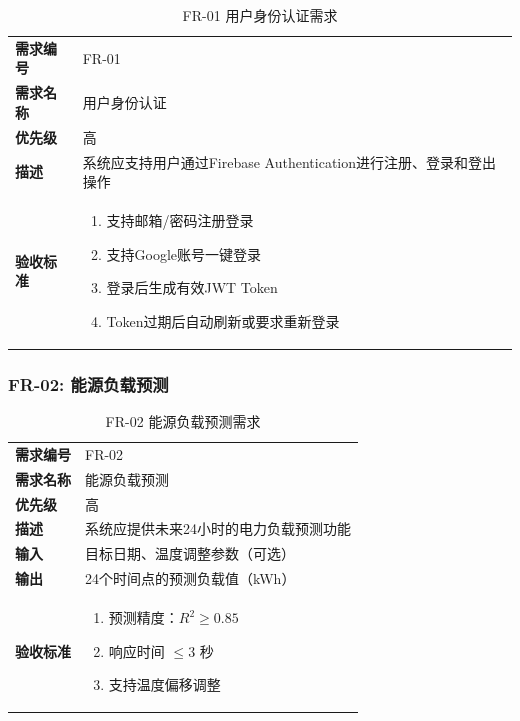 \begin{table}[H]
  \centering
  \caption{FR-01 用户身份认证需求}
  \begin{tabular}{p{3cm}p{10cm}}
    \toprule
    \textbf{需求编号} & FR-01                                        \\
    \textbf{需求名称} & 用户身份认证                                       \\
    \textbf{优先级}  & 高                                            \\
    \textbf{描述}   & 系统应支持用户通过Firebase Authentication进行注册、登录和登出操作 \\
    \textbf{验收标准} &
    \begin{enumerate}[leftmargin=*, nosep]
      \item 支持邮箱/密码注册登录
      \item 支持Google账号一键登录
      \item 登录后生成有效JWT Token
      \item Token过期后自动刷新或要求重新登录
    \end{enumerate}                        \\
    \bottomrule
  \end{tabular}
\end{table}

\subsubsection{FR-02: 能源负载预测}

\begin{table}[htbp]
  \centering
  \caption{FR-02 能源负载预测需求}
  \begin{tabular}{p{3cm}p{10cm}}
    \toprule
    \textbf{需求编号} & FR-02                 \\
    \textbf{需求名称} & 能源负载预测                \\
    \textbf{优先级}  & 高                     \\
    \textbf{描述}   & 系统应提供未来24小时的电力负载预测功能  \\
    \textbf{输入}   & 目标日期、温度调整参数（可选）       \\
    \textbf{输出}   & 24个时间点的预测负载值（kWh）     \\
    \textbf{验收标准} &
    \begin{enumerate}[leftmargin=*, nosep]
      \item 预测精度：$R^2 \geq 0.85$
      \item 响应时间 $\leq 3$ 秒
      \item 支持温度偏移调整
    \end{enumerate} \\
    \bottomrule
  \end{tabular}
\end{table}

